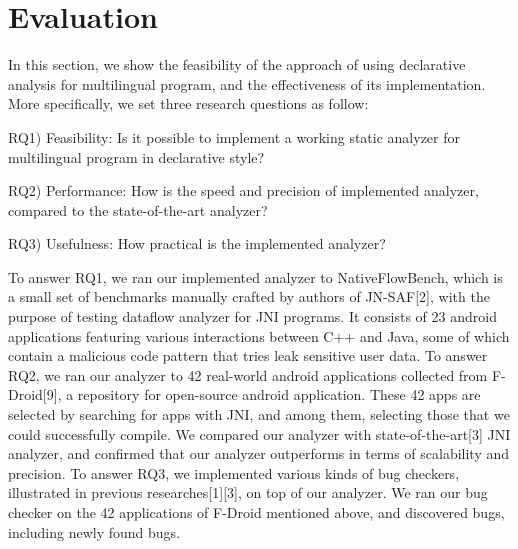 \section{Evaluation}
In this section, we show the feasibility of the approach of using declarative
analysis for multilingual program, and the effectiveness of its
implementation. More specifically, we set three research questions as follow:

RQ1) Feasibility: Is it possible to implement a working static analyzer for multilingual program in declarative style?

RQ2) Performance: How is the speed and precision of implemented analyzer, compared to the state-of-the-art analyzer?

RQ3) Usefulness: How practical is the implemented analyzer?

To answer RQ1, we ran our implemented analyzer to NativeFlowBench, which is a
small set of benchmarks manually crafted by authors of JN-SAF[2], with the
purpose of testing dataflow analyzer for JNI programs. It consists of 23
android applications featuring various interactions between C++ and Java, some
of which contain a malicious code pattern that tries leak sensitive user data.
To answer RQ2, we ran our analyzer to 42 real-world android applications
collected from F-Droid[9], a repository for open-source android application. These
42 apps are selected by searching for apps with JNI, and among them, selecting those
that we could successfully compile. We compared our analyzer with
state-of-the-art[3] JNI analyzer, and confirmed that our analyzer outperforms
in terms of scalability and precision. To answer RQ3, we implemented various
kinds of bug checkers, illustrated in previous researches[1][3], on top of our
analyzer. We ran our bug checker on the 42 applications of F-Droid mentioned
above, and discovered  bugs, including  newly found bugs.



